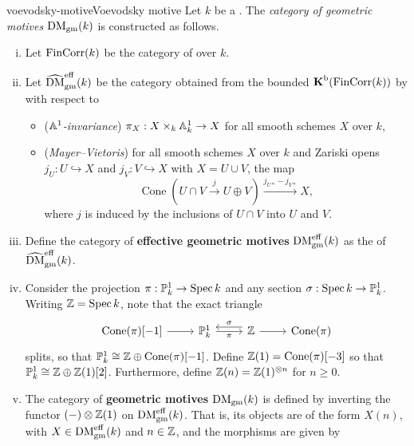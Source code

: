 \begin{topic}{voevodsky-motive}{Voevodsky motive}
    Let $k$ be a . The \textit{category of geometric motives} $\textup{DM}_\textup{gm}(k)$ is constructed as follows.
    \begin{enumerate}[(i)]
        \item Let $\textup{FinCorr}(k)$ be the category of  over $k$.
        \item Let $\widehat{\textup{DM}}_\textup{gm}^\textup{eff}(k)$ be the category obtained from the bounded  $\textbf{K}^\textup{b}(\textup{FinCorr}(k))$ by  with respect to
        \begin{itemize}
            \item (\textit{$\AA^1$-invariance}) $\pi_X : X \times_k \AA^1_k \to X$ for all smooth schemes $X$ over $k$,
            \item (\textit{Mayer--Vietoris}) for all smooth schemes $X$ over $k$ and Zariski opens $j_U : U \hookrightarrow X$ and $j_V : V \hookrightarrow X$ with $X = U \cup V$, the map
            \[ \operatorname{Cone}(U \cap V \xrightarrow{j} U \oplus V) \xrightarrow{j_{U*} - j_{V*}} X , \]
            where $j$ is induced by the inclusions of $U \cap V$ into $U$ and $V$.
        \end{itemize}
        \item Define the category of \textbf{effective geometric motives} $\textup{DM}_\textup{gm}^\textup{eff}(k)$ as the  of $\widehat{\textup{DM}}_\textup{gm}^\textup{eff}(k)$.
        \item Consider the projection $\pi : \PP^1_k \to \Spec k$ and any section $\sigma : \Spec k \to \PP^1_k$. Writing $\ZZ = \Spec k$, note that the exact triangle
        \[ \begin{tikzcd} \operatorname{Cone}(\pi)[-1] \arrow{r} & \PP^1_k \arrow[swap]{r}{\pi} & \ZZ \arrow{r} \arrow[shift right=0.4em, swap]{l}{\sigma} & \operatorname{Cone}(\pi) \end{tikzcd}  \]
        splits, so that $\PP^1_k \cong \ZZ \oplus \operatorname{Cone}(\pi)[-1]$. Define $\ZZ(1) = \operatorname{Cone}(\pi)[-3]$ so that $\PP^1_k \cong \ZZ \oplus \ZZ(1)[2]$. Furthermore, define $\ZZ(n) = \ZZ(1)^{\otimes n}$ for $n \ge 0$.
        \item The category of \textbf{geometric motives} $\textup{DM}_\textup{gm}(k)$ is defined by inverting the functor $(-) \otimes \ZZ(1)$ on $\textup{DM}_\textup{gm}^\textup{eff}(k)$. That is, its objects are of the form $X(n)$, with $X \in \textup{DM}_\textup{gm}^\textup{eff}(k)$ and $n \in \ZZ$, and the morphisms are given by

\end{enumerate}
\end{topic}
